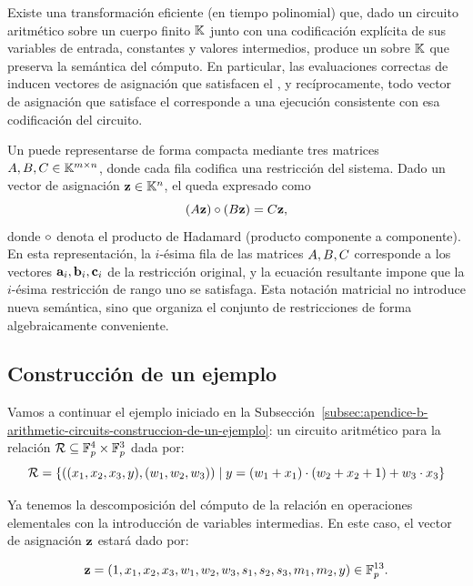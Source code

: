 \begin{theorem}
	Existe una transformación eficiente (en tiempo polinomial) que, dado un circuito aritmético \Circuit sobre un cuerpo finito $\mathbb{K}$ junto con una codificación explícita de sus variables de entrada, constantes y valores intermedios, produce un \ROneCS sobre $\mathbb{K}$ que preserva la semántica del cómputo. En particular, las evaluaciones correctas de \Circuit inducen vectores de asignación que satisfacen el \ROneCS, y recíprocamente, todo vector de asignación que satisface el \ROneCS corresponde a una ejecución consistente con esa codificación del circuito.
\end{theorem}

Un \ROneCS puede representarse de forma compacta mediante tres matrices $A, B, C \in \mathbb{K}^{m \times n}$, donde cada fila codifica una restricción del sistema. Dado un vector de asignación $\mathbf{z} \in \mathbb{K}^n$, el \ROneCS queda expresado como
$$(A\mathbf{z}) \circ (B\mathbf{z}) = C\mathbf{z},$$
donde $\circ$ denota el producto de Hadamard (producto componente a componente). En esta representación, la $i$-ésima fila de las matrices $A,B,C$ corresponde a los vectores $\mathbf{a}_i, \mathbf{b}_i, \mathbf{c}_i$ de la restricción original, y la ecuación resultante impone que la $i$-ésima restricción de rango uno se satisfaga. Esta notación matricial no introduce nueva semántica, sino que organiza el conjunto de restricciones de forma algebraicamente conveniente.

\subsection{Construcción de un ejemplo}
\label{subsec:apendice-b-r1cs-construccion-de-un-ejemplo}

Vamos a continuar el ejemplo iniciado en la Subsección~\ref{subsec:apendice-b-arithmetic-circuits-construccion-de-un-ejemplo}: un circuito aritmético para la relación $\mathcal{R} \subseteq \mathbb{F}_p^4 \times \mathbb{F}_p^3$ dada por:
$$\mathcal{R} = \{((x_1, x_2, x_3, y), (w_1, w_2, w_3)) \mid y = (w_1 + x_1) \cdot (w_2 + x_2 + 1) + w_3 \cdot x_3\}$$

Ya tenemos la descomposición del cómputo de la relación en operaciones elementales con la introducción de variables intermedias. En este caso, el vector de asignación $\mathbf{z}$ estará dado por:

$$\mathbf{z} = (1, x_1, x_2, x_3, w_1, w_2, w_3, s_1, s_2, s_3, m_1, m_2, y) \in \mathbb{F}_p^{13}.$$

